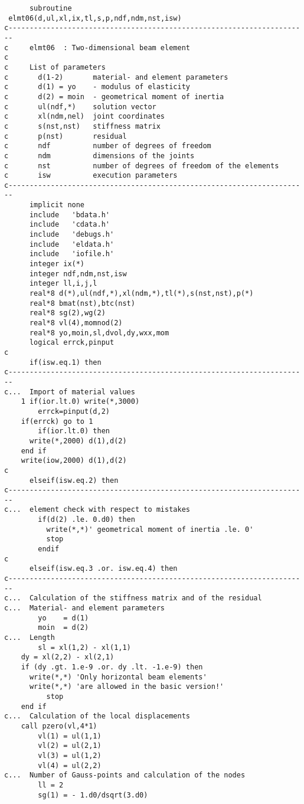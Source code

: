 \newpage
{\small
\begin{verbatim}
      subroutine
 elmt06(d,ul,xl,ix,tl,s,p,ndf,ndm,nst,isw)
c-----------------------------------------------------------------------
c     elmt06  : Two-dimensional beam element
c
c     List of parameters
c       d(1-2)       material- and element parameters
c       d(1) = yo    - modulus of elasticity
c       d(2) = moin  - geometrical moment of inertia
c       ul(ndf,*)    solution vector
c       xl(ndm,nel)  joint coordinates
c       s(nst,nst)   stiffness matrix
c       p(nst)       residual
c       ndf          number of degrees of freedom 
c       ndm          dimensions of the joints
c       nst          number of degrees of freedom of the elements
c       isw          execution parameters
c-----------------------------------------------------------------------
      implicit none
      include   'bdata.h'
      include   'cdata.h'
      include   'debugs.h'
      include   'eldata.h'
      include   'iofile.h'
      integer ix(*)
      integer ndf,ndm,nst,isw
      integer ll,i,j,l
      real*8 d(*),ul(ndf,*),xl(ndm,*),tl(*),s(nst,nst),p(*)
      real*8 bmat(nst),btc(nst)
      real*8 sg(2),wg(2)
      real*8 vl(4),momnod(2)
      real*8 yo,moin,sl,dvol,dy,wxx,mom
      logical errck,pinput
c
      if(isw.eq.1) then
c-----------------------------------------------------------------------
c...  Import of material values
    1 if(ior.lt.0) write(*,3000)
        errck=pinput(d,2)
	if(errck) go to 1
        if(ior.lt.0) then
	  write(*,2000) d(1),d(2)
	end if
	write(iow,2000) d(1),d(2)
c
      elseif(isw.eq.2) then
c-----------------------------------------------------------------------
c...  element check with respect to mistakes
        if(d(2) .le. 0.d0) then
          write(*,*)' geometrical moment of inertia .le. 0'
          stop
        endif
c
      elseif(isw.eq.3 .or. isw.eq.4) then
c-----------------------------------------------------------------------
c...  Calculation of the stiffness matrix and of the residual
c...  Material- and element parameters
        yo    = d(1)
        moin  = d(2)
c...  Length
        sl = xl(1,2) - xl(1,1)
	dy = xl(2,2) - xl(2,1)
	if (dy .gt. 1.e-9 .or. dy .lt. -1.e-9) then
	  write(*,*) 'Only horizontal beam elements'
	  write(*,*) 'are allowed in the basic version!'
          stop
	end if
c...  Calculation of the local displacements
	call pzero(vl,4*1)
        vl(1) = ul(1,1)
        vl(2) = ul(2,1)
        vl(3) = ul(1,2)
        vl(4) = ul(2,2)
c...  Number of Gauss-points and calculation of the nodes  
        ll = 2
        sg(1) = - 1.d0/dsqrt(3.d0)

\end{verbatim}}
